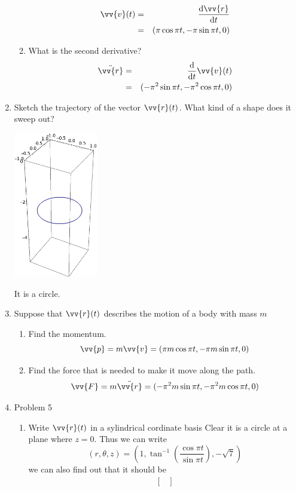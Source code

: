 \documentclass[aps,prl,reprint]{revtex4-1}
\newcommand{\de}{\mathrm{d}}
\begin{document}
\begin{enumerate}
\begin{enumerate}
\begin{eqnarray*}
\vv{v}(t) &=& \frac{\mathrm{d}\vv{r}}{\mathrm{d}t} \\
&=& (\pi\cos\pi t, -\pi \sin\pi t, 0)
\end{eqnarray*}
\item What is the second derivative?
\begin{eqnarray*}
\ddot{\vv{r}} &=& \frac{\de}{\de t} \vv{v}(t) \\
&=& (-\pi^2\sin\pi t, -\pi^2 \cos\pi t, 0)
\end{eqnarray*}
\end{enumerate}
\item Sketch the trajectory of the vector $\vv{r}(t)$. What kind of a shape does it sweep out?
\begin{center}
 \includegraphics[height=2.5in]{plot1.pdf}
\end{center}
It is a circle.
\item Suppose that $\vv{r}(t)$ describes the motion of a body with mass $m$
\begin{enumerate}
\item Find the momentum.
\[
\vv{p} = m\vv{v} = (\pi m \cos\pi t, -\pi m \sin\pi t, 0)
\]
\item Find the force that is needed to make it move along the path.
\[
\vv{F} = m\ddot{\vv{r}} = (-\pi^2 m \sin\pi t, -\pi^2 m \cos\pi t, 0)
\]
\end{enumerate}
\item Problem 5
\begin{enumerate}
\item Write $\vv{r}(t)$ in a sylindrical cordinate basis
Clear it is a circle at a plane where $z = 0$. Thus we can write
\[
(r, \theta, z) = (1, \tan^{-1}(\frac{\cos\pi t}{\sin \pi t}), -\sqrt{7})
\]
we can also find out that it should be
\begin{eqnarray*}
\begin{bmatrix}

\end{bmatrix}
\end{eqnarray*}
\end{enumerate}
\end{enumerate}
\end{document}
